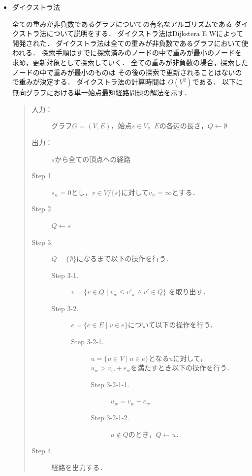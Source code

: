 \documentclass[12pt]{optlab-bachelor}
\begin{document}
\begin{itemize}
  \item ダイクストラ法

  全ての重みが非負数であるグラフについての有名なアルゴリズムである
  ダイクストラ法について説明をする．
  ダイクストラ法はDijkstera E W\cite{Dijkstera}によって開発された．
  ダイクストラ法は全ての重みが非負数であるグラフにおいて使われる．
  探索手順はすでに探索済みのノードの中で重みが最小のノードを
  求め，更新対象として探索していく．
  全ての重みが非負数の場合，探索したノードの中で重みが最小のものは
  その後の探索で更新されることはないので重みが決定する．
  ダイクストラ法の計算時間は $O(V^2)$である．
  以下に無向グラフにおける単一始点最短経路問題の解法を示す．

  \begin{quote}
    \begin{description}
      \item[入力：] グラフ$G=(V,E)$，始点$s \in V$，$E$の各辺の長さ，$Q \leftarrow \emptyset$
      \item[出力：] $s$から全ての頂点への経路
      \item[Step 1.] $s_w = 0$とし，$v \in V/ \{ s\}$に対して$v_w = \infty$とする．
      \item[Step 2.] $Q \leftarrow s$
      \item[Step 3.] $Q = \{\emptyset\}$になるまで以下の操作を行う．
      \begin{description}
        \item[Step 3-1.] $v = \{ v \in Q \mid v_w \leq v'_w \land v' \in Q \}$
        を取り出す．
        \item[Step 3-2.] $e = \{ e \in E \mid v \in e \}$について以下の操作を行う．

        \begin{description}
          \item[Step 3-2-1.] $u = \{ u \in V \mid u \in e\}$となる$u$に対して，
          $u_w > v_w + e_w$を満たすとき以下の操作を行う．

          \begin{description}
            \item[Step 3-2-1-1.] $u_w = v_w + e_w$.
            \item[Step 3-2-1-2.] $u \notin Q$のとき，$Q \leftarrow u$．
          \end{description}
        \end{description}
      \end{description}

      \item[Step 4.] 経路を出力する．
    \end{description}
  \end{quote}
\end{itemize}
\end{document}
